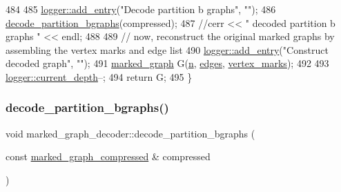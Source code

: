 \begin{DoxyCode}
484 
485   \hyperlink{classlogger_a710163deb17bc81f70d53d285b8ac9ac}{logger::add\_entry}(\textcolor{stringliteral}{"Decode partition b graphs"}, \textcolor{stringliteral}{""});
486   \hyperlink{classmarked__graph__decoder_aea53529191c7d56a897620b3d842ffaa}{decode\_partition\_bgraphs}(compressed);
487   \textcolor{comment}{//cerr << " decoded partition b graphs " << endl;}
488 
489   \textcolor{comment}{// now, reconstruct the original marked graphs by assembling the vertex marks and edge list}
490   \hyperlink{classlogger_a710163deb17bc81f70d53d285b8ac9ac}{logger::add\_entry}(\textcolor{stringliteral}{"Construct decoded graph"}, \textcolor{stringliteral}{""});
491   \hyperlink{classmarked__graph}{marked\_graph} G(\hyperlink{classmarked__graph__decoder_aefc93611bc4a3e9a5d3956d97649a0e9}{n}, \hyperlink{classmarked__graph__decoder_af9e75da0a495d9c3bdcd169e15e3261e}{edges}, \hyperlink{classmarked__graph__decoder_a98be932a5abff7efbc8dd4290268b69a}{vertex\_marks});
492 
493   \hyperlink{classlogger_a9d29b49bd318a719a8e85b59eac54fe0}{logger::current\_depth}--;
494   \textcolor{keywordflow}{return} G;
495 \}
\end{DoxyCode}
\mbox{\label{classmarked__graph__decoder_aea53529191c7d56a897620b3d842ffaa}} 
\subsubsection{\texorpdfstring{decode\+\_\+partition\+\_\+bgraphs()}{decode\_partition\_bgraphs()}}
{\footnotesize\ttfamily void marked\+\_\+graph\+\_\+decoder\+::decode\+\_\+partition\+\_\+bgraphs (\begin{DoxyParamCaption}\item[{const \hyperlink{classmarked__graph__compressed}{marked\+\_\+graph\+\_\+compressed} \&}]{compressed }\end{DoxyParamCaption})\hspace{0.3cm}{\ttfamily [private]}}


